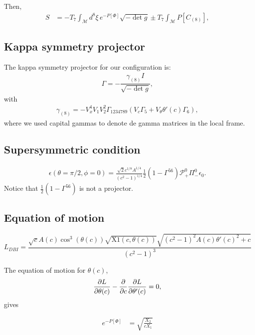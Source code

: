 Then,
\begin{align}
 S & = -T_7 \int_\mathcal{M} d^8\xi \, e^{-P[\Phi] } \sqrt{-\det g} \pm
 T_7\int _\mathcal{M} P[C_{(8)}],
\end{align}

\subsection{Kappa symmetry projector}

The kappa symmetry projector for our configuration is:
\begin{align}
\Gamma = - \dfrac{ \gamma_{(8)} I }{\sqrt{-\det g}},
\end{align}
with
\begin{align}
 \gamma_{(8)} = - V_x^4 V_1 V_2^2 \Gamma_{1 2 3 4 7 8 9}( V_c \Gamma_5 +  V_{\theta} \theta'(c) \Gamma_6), 
\end{align}
where we used capital gammas to denote de gamma matrices in the local frame. 


\subsection{Supersymmetric condition}

\begin{align}\label{eq: KillingSpinorClassic}
\epsilon(\theta=\pi/2,\phi=0) = \frac{\sqrt{2}c^{1/8}A^{1/4}}{(c^2-1)^{1/4}}
\frac{1}{2}(1-\Gamma^{56})\mathcal{P}_+^{0} \Pi^0_-\epsilon_0.
\end{align}
Notice that $\frac{1}{2}(1-\Gamma^{56})$ is not a projector. 



\subsection{Equation of motion}

\begin{equation}
 L_{DBI} = \frac{\sqrt{c} A(c) \cos ^3(\theta (c)) \sqrt{\text{X1}(c,\theta (c))} \sqrt{\left(c^2-1\right)^2 A(c) \theta '(c)^2+c}}{\left(c^2-1\right)^3}
\end{equation}

The equation of motion for $\theta(c)$,
\begin{equation}
\dfrac{\partial L}{\partial \theta(c)} - \dfrac{\partial}{\partial c} \dfrac{\partial L}{\partial \theta'(c)} = 0,
\end{equation}
gives



\begin{align*}
% 
e^{-P[\Phi]} &=\sqrt{\frac{X_2}{c X_1}}
\end{align*}
